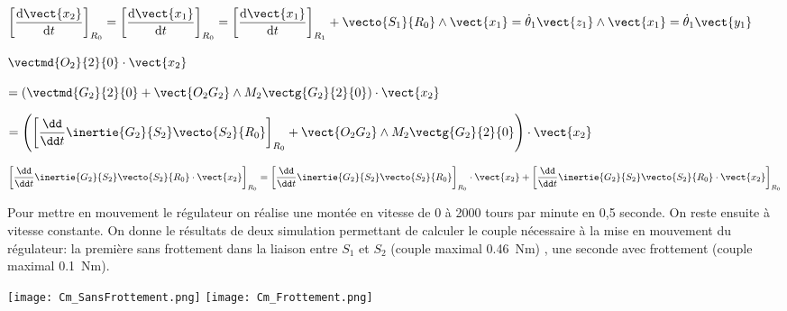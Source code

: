 \begin{multicols}{2}
\begin{corrige}
$\left[\dfrac{\text{d} \vect{x_2}}{\text{d} t}\right]_{R_0}
=\left[\dfrac{\text{d} \vect{x_1}}{\text{d} t}\right]_{R_0}
=\left[\dfrac{\text{d} \vect{x_1}}{\text{d} t}\right]_{R_1} + \vecto{S_1}{R_0}\wedge\vect{x_1}
=\dot{\theta}_1 \vect{z_1} \wedge  \vect{x_1}
=\dot{\theta}_1 \vect{y_1}$




\end{corrige}
\else
\fi


\ifprof
\begin{corrige}


$\vectmd{O_2}{2}{0}\cdot \vect{x_2}$

$= \left( \vectmd{G_2}{2}{0}+\vect{O_2G_2}\wedge M_2\vectg{G_2}{2}{0}\right)\cdot \vect{x_2}$

$= \left( \left[\dfrac{\dd}{\dd t}\inertie{G_2}{S_2}\vecto{S_2}{R_0}\right]_{R_0}
+\vect{O_2G_2}\wedge M_2\vectg{G_2}{2}{0}\right)\cdot \vect{x_2}$

$\left[\dfrac{\dd}{\dd t}\inertie{G_2}{S_2}\vecto{S_2}{R_0} \cdot \vect{x_2} \right]_{R_0}
=\left[\dfrac{\dd}{\dd t}\inertie{G_2}{S_2}\vecto{S_2}{R_0}  \right]_{R_0}\cdot \vect{x_2}+\left[\dfrac{\dd}{\dd t}\inertie{G_2}{S_2}\vecto{S_2}{R_0} \cdot \vect{x_2} \right]_{R_0}$
\end{corrige}
\else
\fi



Pour mettre en mouvement le régulateur on réalise une montée en vitesse de 0 à 2000 tours par minute en 0,5 seconde.  On reste ensuite à vitesse constante. On donne le résultats de deux simulation permettant de calculer le couple nécessaire à la mise en mouvement du régulateur: la première sans frottement dans la liaison entre $S_1$ et $S_2$ (couple maximal \SI{0,46}{Nm}) , une seconde avec frottement (couple maximal \SI{0,1}{Nm}). 




\ifprof
\else
\end{multicols}
\fi

\begin{center}
\texttt{[image: Cm\_SansFrottement.png]}
\texttt{[image: Cm\_Frottement.png]}
\end{center}



